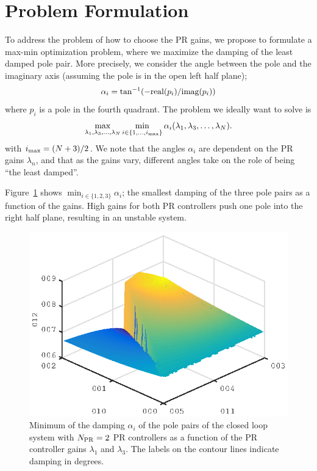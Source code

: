 \documentclass[conference,10pt]{IEEEtran}
\begin{document}
\section{Problem Formulation}
To address the problem of how to choose the PR gains, we propose to formulate a max-min optimization problem, where we maximize the damping of the least damped pole pair. More precisely, we consider the angle between the pole and the imaginary axis (assuming the pole is in the open left half plane);
\begin{align*}
\alpha_i = \tan^{-1}(-{\rm real}(p_i) / {\rm imag}(p_i))
\end{align*}
where $p_i$ is a pole in the fourth quadrant. The problem we ideally want to solve is
\begin{align}
\label{eq:MaxMinProb}
\max_{\lambda_1,\lambda_3,\dots, \lambda_N}\min_{i\in \{1, \dots, i_{\rm max}\}} \alpha_i(\lambda_1,\lambda_3,\dots, \lambda_N).
\end{align}
with $i_{\rm max} = (N+3)/2$. We note that the angles $\alpha_i$ are dependent on the PR gains $\lambda_n$, and that as the gains vary, different angles take on the role of being ``the least damped''.


Figure~\ref{fig:DampingExample} shows $\min_{i\in\{1,2,3\}}\alpha_i$; the smallest damping of the three pole pairs as a function of the gains. High gains for both PR controllers push one pole into the right half plane, resulting in an unstable system.
\begin{figure}[!h]
\centering

\includegraphics{fig/root_locus_2D_in_3D}
\caption{Minimum of the damping $\alpha_i$ of the pole pairs of the closed loop system with $N_{\rm PR}=2$ PR controllers as a function of the PR controller gains $\lambda_1$ and $\lambda_3$. The labels on the contour lines indicate damping in degrees.}
\label{fig:DampingExample}
\end{figure}
\end{document}
